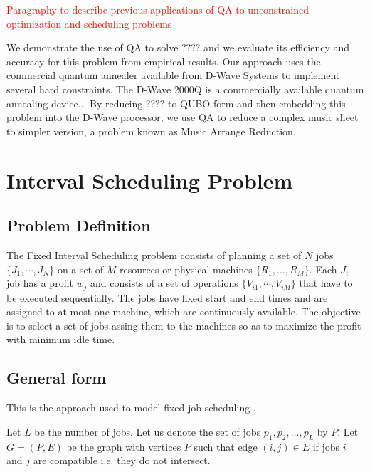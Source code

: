 \documentclass[11pt,a4paper]{article}
\begin{document}
\textcolor{red}{Paragraphy to describe previous applications of QA to unconstrained optimization and scheduling problems} \cite{ikeda2019application}


We demonstrate the use of QA to solve ???? and we evaluate its efficiency and accuracy for this problem
from empirical results. Our approach uses the commercial quantum annealer available from D-Wave Systems to
implement several hard constraints. The D-Wave 2000Q is a commercially available quantum annealing device... By reducing ???? to QUBO form and then embedding this problem into the D-Wave processor, we use QA to reduce a complex music sheet to simpler version, a problem known as Music Arrange Reduction. 

\section{Interval Scheduling Problem}
\subsection{Problem Definition}
The Fixed Interval Scheduling problem consists of planning a set of $N$ jobs $\{J_1, \cdots,J_N \}$ on a set of $M$ resources or physical machines $\{R_1, ...,R_M \}$. Each $J_i$ job has a  profit $w_j$ and consists of a set of operations $\{V_{i1}, \cdots , V_{iM} \}$ that have to be executed sequentially. The jobs have fixed start and end times and are assigned to at most one machine, which are continuously available. The objective is to select a set of jobs assing them to the machines so as to maximize the profit with minimum idle time. 
\subsection{General form}

This is the approach used to model fixed job scheduling \cite{arkin1987scheduling, barcia2005k}. 

Let $L $ be the number of jobs. Let us denote the set of jobs $ p_1,p_2,\dots,p_L $ by $ P $. Let $ G=(P,E) $ be the graph with vertices $ P $ such that edge $(i,j) \in E$ if jobs $ i $ and $ j $ are compatible i.e. they do not intersect.
\end{document}
